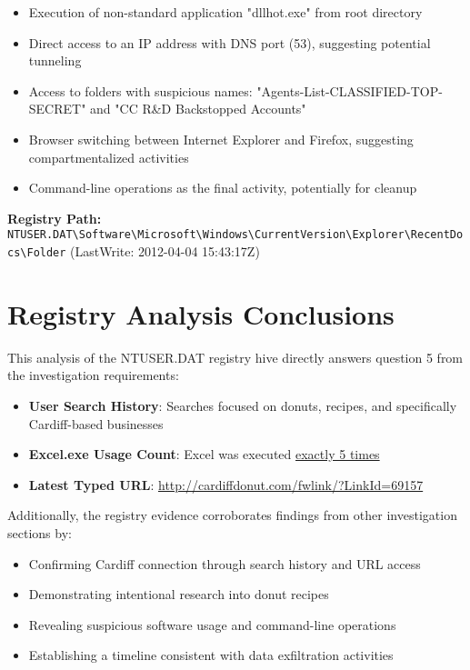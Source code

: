 \begin{itemize}
    \item Execution of non-standard application "dllhot.exe" from root directory
    \item Direct access to an IP address with DNS port (53), suggesting potential tunneling
    \item Access to folders with suspicious names: "Agents-List-CLASSIFIED-TOP-SECRET" and "CC R\&D Backstopped Accounts"
    \item Browser switching between Internet Explorer and Firefox, suggesting compartmentalized activities
    \item Command-line operations as the final activity, potentially for cleanup
\end{itemize}

\textbf{Registry Path:} \texttt{NTUSER.DAT\textbackslash Software\textbackslash Microsoft\textbackslash Windows\textbackslash CurrentVersion\textbackslash Explorer\textbackslash RecentDocs\textbackslash Folder} (LastWrite: 2012-04-04 15:43:17Z)

\section{Registry Analysis Conclusions}
This analysis of the NTUSER.DAT registry hive directly answers question 5 from the investigation requirements:

\begin{itemize}
    \item \textbf{User Search History}: Searches focused on donuts, recipes, and specifically Cardiff-based businesses
    \item \textbf{Excel.exe Usage Count}: Excel was executed \underline{exactly 5 times}
    \item \textbf{Latest Typed URL}: \url{http://cardiffdonut.com/fwlink/?LinkId=69157}
\end{itemize}

Additionally, the registry evidence corroborates findings from other investigation sections by:

\begin{itemize}
    \item Confirming Cardiff connection through search history and URL access
    \item Demonstrating intentional research into donut recipes
    \item Revealing suspicious software usage and command-line operations
    \item Establishing a timeline consistent with data exfiltration activities
\end{itemize}